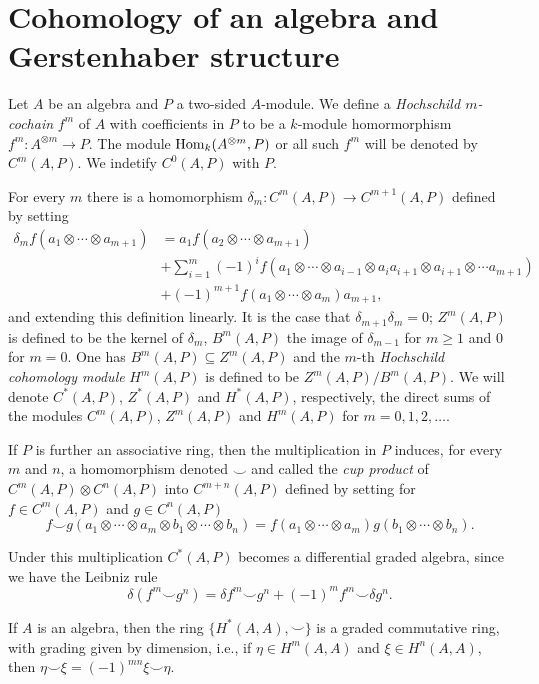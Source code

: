 \documentclass[TFM.tex]{subfiles}
\begin{document}
\section{Cohomology of an algebra and Gerstenhaber structure}

\begin{defi}Let $A$ be an algebra and $P$ a two-sided $A$-module. We define a \emph{Hochschild $m$-cochain} $f^m$ of $A$ with coefficients in $P$ to be a $k$-module homormorphism $f^m: A^{\otimes m}\to P$. The module $\operatorname{Hom}_k(A^{\otimes m}, P)$ or all such $f^m$ will be denoted by $C^m(A,P)$. We indetify $C^0(A,P)$ with $P$.
\end{defi}

For every $m$ there is a homomorphism $\delta_m: C^m(A,P)\to C^{m+1}(A,P)$ defined by setting
\begin{align*}
\delta_m f(a_1\otimes\cdots\otimes a_{m+1})&=a_1f(a_2\otimes\cdots\otimes a_{m+1})\\
& +\sum_{i=1}^m(-1)^if(a_1\otimes\cdots\otimes a_{i-1}\otimes a_ia_{i+1}\otimes a_{i+1}\otimes\cdots a_{m+1})\\
& +(-1)^{m+1}f(a_1\otimes\cdots\otimes a_m)a_{m+1},
\end{align*}
and extending this definition linearly. It is the case that $\delta_{m+1}\delta_m=0$; $Z^m(A,P)$ is defined to be the kernel of $\delta_m$, $B^m(A,P)$ the image of $\delta_{m-1}$ for $m\geq 1$ and 0 for $m=0$. One has $B^m(A,P)\subseteq Z^m(A,P)$ and the $m$-th \emph{Hochschild cohomology module} $H^m(A,P)$ is defined to be $Z^m(A,P)/B^m(A,P)$. We will denote $C^*(A,P)$, $Z^*(A,P)$ and $H^*(A,P)$, respectively, the direct sums of the modules $C^m(A,P)$, $Z^m(A,P)$ and $H^m(A,P)$ for $m=0,1,2,\dots$. 

If $P$ is further an associative ring, then the multiplication in $P$ induces, for every $m$ and $n$, a homomorphism denoted $\smile$ and called the \emph{cup product} of $C^m(A,P)\otimes C^n(A,P)$ into $C^{m+n}(A,P)$ defined by setting for $f\in C^m(A,P)$ and $g\in C^n(A,P)$
\[
f\smile g(a_1\otimes\cdots\otimes a_m\otimes b_1\otimes\cdots\otimes b_n)=f(a_1\otimes\cdots\otimes a_m)g(b_1\otimes\cdots\otimes b_n).
\]

Under this multiplication $C^*(A,P)$ becomes a differential graded algebra, since we have the Leibniz rule
\[\delta (f^m\smile g^n)=\delta f^m\smile g^n+(-1)^m f^m\smile \delta g^n.\]

\begin{thm}\cite[Corollary 1 of ]{Gerstenhaber}
If $A$ is an algebra, then the ring $\{H^*(A,A),\smile\}$ is a graded commutative ring, with grading given by dimension, i.e., if $\eta\in H^m(A,A)$ and $\xi\in H^n(A,A)$, then $\eta\smile \xi =(-1)^{mn}\xi\smile \eta$.
\end{thm} 
\end{document}
